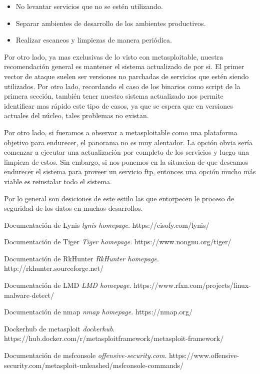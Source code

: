 \documentclass[11pt]{utalcaDoc}
\begin{document}
\begin{itemize}
	\item No levantar servicios que no se estén utilizando.
	\item Separar ambientes de desarrollo de los ambientes productivos.
	\item Realizar escaneos y limpiezas de manera periódica.
\end{itemize}

Por otro lado, ya mas exclusivas de lo visto con metasploitable, nuestra recomendación general es mantener el sistema actualizado de por si. El primer vector de ataque suelen ser versiones no parchadas de servicios que estén siendo utilizados. Por otro lado, recordando el caso de los binarios como script de la primera sección, también tener nuestro sistema actualizado nos permite identificar mas rápido este tipo de casos, ya que se espera que en versiones actuales del núcleo, tales problemas no existan.

Por otro lado, si fueramos a observar a metasploitable como una plataforma objetivo para endurecer, el panorama no es muy alentador. La opción obvia sería comenzar a ejecutar una actualización por completo de los servicios y luego una limpieza de estos. Sin embargo, si nos ponemos en la situacion de que deseamos endurecer el sistema para proveer un servicio ftp, entonces una opción mucho más viable es reinstalar todo el sistema.

Por lo general son desiciones de este estilo las que entorpecen le proceso de seguridad de los datos en muchos desarrollos.
\begin{thebibliography}{9}

	Documentación de Lynis
	\textit{lynis homepage}.
	https://cisofy.com/lynis/

	Documentación de Tiger
	\textit{Tiger homepage}.
	https://www.nongnu.org/tiger/

	
	Documentación de RkHunter
	\textit{RkHunter homepage}.
	http://rkhunter.sourceforge.net/

	
	Documentación de LMD
	\textit{LMD homepage}.
	https://www.rfxn.com/projects/linux-malware-detect/

	Documentación de nmap
	\textit{nmap homepage}.
	https://nmap.org/

	Dockerhub de metasploit
	\textit{dockerhub}.
	https://hub.docker.com/r/metasploitframework/metasploit-framework/


	Documentación de msfconsole
	\textit{offensive-security.com}.
	https://www.offensive-security.com/metasploit-unleashed/msfconsole-commands/
\end{thebibliography}
\end{document}
